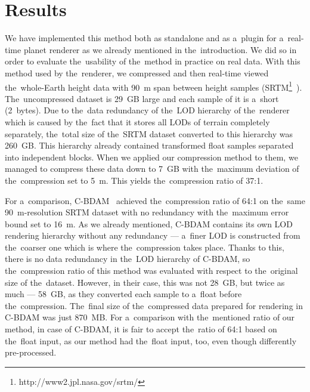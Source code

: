 \chapter{Results}\label{chap:results}

We have implemented this method both as standalone and as a~plugin for a~real-time planet renderer as we already mentioned in the~introduction. We did so in order to evaluate the~usability of the~method in practice on real data. With this method used by the~renderer, we compressed and then real-time viewed the~whole-Earth height data with 90~m span between height samples (SRTM\footnote{http://www2.jpl.nasa.gov/srtm/}~\cite{srtm}). The~uncompressed dataset is 29~GB large and each sample of it is a~short (2~bytes). Due to the~data redundancy of the~LOD hierarchy of the~renderer which is caused by the~fact that it stores all LODs of terrain completely separately, the~total size of the~SRTM dataset converted to this hierarchy was 260~GB. This hierarchy already contained transformed float samples separated into independent blocks. When we applied our compression method to them, we managed to compress these data down to 7~GB with the~maximum deviation of the~compression set to 5~m. This yields the~compression ratio of 37:1.

For a~comparison, C-BDAM~\cite{cbdam} achieved the~compression ratio of 64:1 on the~same 90~m-resolution SRTM dataset with no redundancy with the~maximum error bound set to 16~m. As we already mentioned, C-BDAM contains its own LOD rendering hierarchy without any redundancy --- a~finer LOD is constructed from the~coarser one which is where the~compression takes place. Thanks to this, there is no data redundancy in the~LOD hierarchy of C-BDAM, so the~compression ratio of this method was evaluated with respect to the~original size of the~dataset. However, in their case, this was not 28~GB, but twice as much --- 58~GB, as they converted each sample to a~float before the~compression. The~final size of the~compressed data prepared for rendering in C-BDAM was just 870~MB. For a~comparison with the~mentioned ratio of our method, in case of C-BDAM, it is fair to accept the~ratio of 64:1 based on the~float input, as our method had the~float input, too, even though differently pre-processed.

